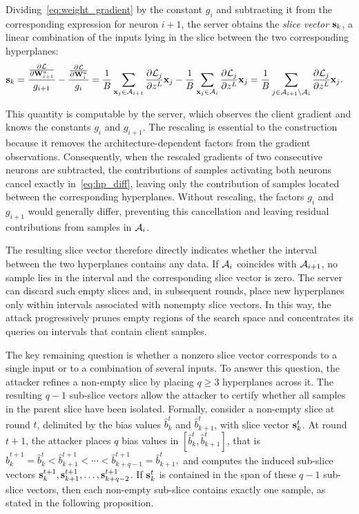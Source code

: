 Dividing~\eqref{eq:weight_gradient} by the constant $g_i$ and subtracting it from the corresponding expression for neuron $i+1$, the server obtains the \emph{slice vector} $\mathbf{s}_k$, a linear combination of the inputs lying in the slice between the two corresponding hyperplanes:
\begin{align}
   \mathbf{s}_k &=  \frac{\frac{\partial \mathcal{L}}{\partial \mathbf{W}_{i+1}^a}}{g_{i+1}} - \frac{\frac{\partial \mathcal{L}}{\partial \mathbf{W}_{i}^a}}{g_i} = \frac{1}{B} \sum_{{\mathbf{x}}_j \in \mathcal{A}_{i+1}} \frac{\partial \mathcal{L}_j}{\partial z^{L}} {\mathbf{x}}_j - \frac{1}{B} \sum_{{\mathbf{x}}_j \in \mathcal{A}_{i}} \frac{\partial \mathcal{L}_j}{\partial z^{L}} {\mathbf{x}}_j  = \frac{1}{B} \sum_{j \in \mathcal{A}_{i+1} \setminus \mathcal{A}_{i} 
    } \frac{\partial \mathcal{L}_j}{\partial z^{L}} {\mathbf{x}}_j \label{eq:hp_diff}.
\end{align}

This quantity is computable by the server, which observes the client gradient and knows the constants $g_i$ and $g_{i+1}$. The rescaling is essential to the construction because it removes the architecture-dependent factors from the gradient observations. Consequently, when the rescaled gradients of two consecutive neurons are subtracted, the contributions of samples activating both neurons cancel exactly in~\eqref{eq:hp_diff}, leaving only the contribution of samples located between the corresponding hyperplanes. Without rescaling, the factors $g_i$ and $g_{i+1}$ would generally differ, preventing this cancellation and leaving residual contributions from samples in $\mathcal{A}_i$.

The resulting slice vector therefore directly indicates whether the interval between the two hyperplanes contains any data. If $\mathcal{A}_i$ coincides with $\mathcal{A}_{i+1}$, no sample lies in the interval and the corresponding slice vector is zero. The server can discard such empty slices and, in subsequent rounds, place new hyperplanes only within intervals associated with nonempty slice vectors. In this way, the attack progressively prunes empty regions of the search space and concentrates its queries on intervals that contain client samples.

The key remaining question is whether a nonzero slice vector corresponds to a single input or to a combination of several inputs. To answer this question, the attacker refines a non-empty slice by placing $q\ge 3$ hyperplanes across it. The resulting $q-1$ sub-slice vectors allow the attacker to certify whether all samples in the parent slice have been isolated. Formally, consider a non-empty slice at round $t$, delimited by the bias values $\hat b_k^{t}$ and $\hat b_{k+1}^{t}$, with slice vector $\mathbf{s}_k^t$. At round $t+1$, the attacker places $q$ bias values in $[\hat b_k^{t}, \hat b_{k+1}^t]$, that is
$
\hat b_{k}^{t+1} = \hat b_{k}^{t}
< \hat b_{k+1}^{t+1}
< \cdots
< \hat b_{k+q-1}^{t+1}
= \hat b_{k+1}^{t},
$
and computes the induced sub-slice vectors $\mathbf{s}_k^{t+1}, \mathbf{s}_{k+1}^{t+1}, \dots, \mathbf{s}_{k+q-2}^{t+1}$. If $\mathbf{s}_k^t$ is contained in the span of these $q-1$ sub-slice vectors, then each non-empty sub-slice contains exactly one sample, as stated in the following proposition.

